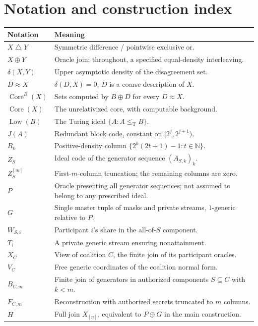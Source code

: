 \documentclass[11pt,letterpaper]{article}
\theoremstyle{plain}
\theoremstyle{definition}
\theoremstyle{remark}
\numberwithin{equation}{section}
\newcommand{\N}{\mathbb N}
\newcommand{\leT}{\leq_{\mathrm T}}
\newcommand{\Core}{\operatorname{Core}}
\newcommand{\Low}{\operatorname{Low}}
\newcommand{\bitsum}{\mathbin{\triangle}}
\newcommand{\join}{\mathbin{\oplus}}
\begin{document}
\section{Notation and construction index}\label{cr11:app:notation}
\begin{center}\small
\begin{longtable}{@{}p{}p{}@{}}
\toprule
Notation & Meaning\\
\midrule
\endhead
$X\bitsum Y$ & Symmetric difference / pointwise exclusive or.\\
$X\join Y$ & Oracle join; throughout, a specified equal-density interleaving.\\
$\delta(X,Y)$ & Upper asymptotic density of the disagreement set.\\
$D\approx X$ & $\delta(D,X)=0$; $D$ is a coarse description of $X$.\\
$\Core^B(X)$ & Sets computed by $B\join D$ for every $D\approx X$.\\
$\Core(X)$ & The unrelativized core, with computable background.\\
$\Low(B)$ & The Turing ideal $\{A:A\leT B\}$.\\
$J(A)$ & Redundant block code, constant on $[2^j,2^{j+1})$.\\
$R_k$ & Positive-density column $\{2^k(2t+1)-1:t\in\N\}$.\\
$Z_S$ & Ideal code of the generator sequence $(A_{S,k})_k$.\\
$Z_S^{[m]}$ & First-$m$-column truncation; the remaining columns are zero.\\
$P$ & Oracle presenting all generator sequences; not assumed to belong to any prescribed ideal.\\
$G$ & Single master tuple of masks and private streams, $1$-generic relative to $P$.\\
$W_{S,i}$ & Participant $i$'s share in the all-of-$S$ component.\\
$T_i$ & A private generic stream ensuring nonattainment.\\
$X_C$ & View of coalition $C$, the finite join of its participant oracles.\\
$V_C$ & Free generic coordinates of the coalition normal form.\\
$B_{C,m}$ & Finite join of generators in authorized components $S\subseteq C$ with $k<m$.\\
$F_{C,m}$ & Reconstruction with authorized secrets truncated to $m$ columns.\\
$H$ & Full join $X_{[n]}$, equivalent to $P\join G$ in the main construction.\\
\bottomrule
\end{longtable}
\end{center}
\end{document}

